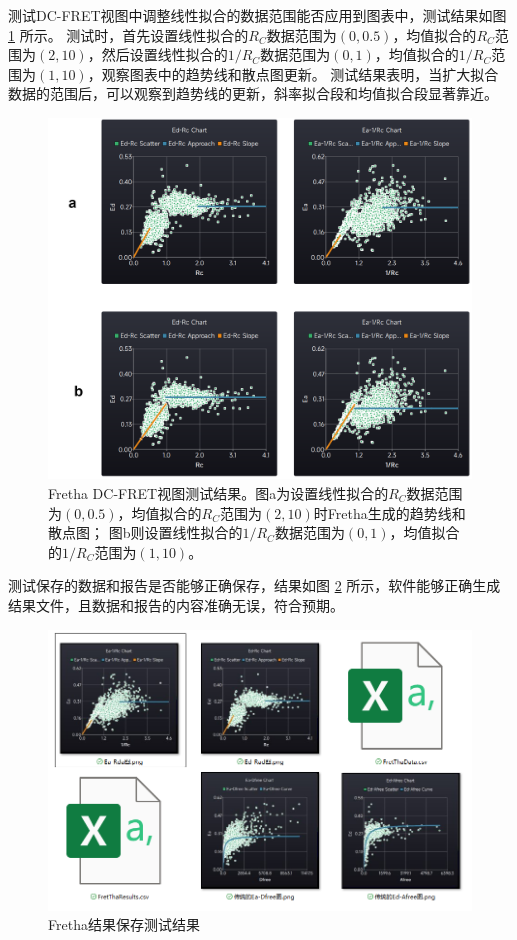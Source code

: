 测试DC-FRET视图中调整线性拟合的数据范围能否应用到图表中，测试结果如图 \ref{fig:DC-FRET视图测试} 所示。
测试时，首先设置线性拟合的$R_C$数据范围为$(0,0.5)$，均值拟合的$R_C$范围为$(2,10)$，然后设置线性拟合的$1/R_C$数据范围为$(0,1)$，均值拟合的$1/R_C$范围为$(1,10)$，观察图表中的趋势线和散点图更新。
测试结果表明，当扩大拟合数据的范围后，可以观察到趋势线的更新，斜率拟合段和均值拟合段显著靠近。
\begin{figure}
  \centering
  \includegraphics[width=0.9\linewidth]{../figures/4/4_DC-FRET参数测试.png}
  \caption[Fretha DC-FRET视图测试结果。]{Fretha DC-FRET视图测试结果。图a为设置线性拟合的$R_C$数据范围为$(0,0.5)$，均值拟合的$R_C$范围为$(2,10)$时Fretha生成的趋势线和散点图；
  图b则设置线性拟合的$1/R_C$数据范围为$(0,1)$，均值拟合的$1/R_C$范围为$(1,10)$。}
  \label{fig:DC-FRET视图测试}
\end{figure}

测试保存的数据和报告是否能够正确保存，结果如图 \ref{fig:结果保存测试} 所示，软件能够正确生成结果文件，且数据和报告的内容准确无误，符合预期。
\begin{figure}[hbtp]
  \centering
  \includegraphics[width=0.6\linewidth]{../figures/2/2_保存数据.png}
  \caption{Fretha结果保存测试结果}
  \label{fig:结果保存测试}
\end{figure}

